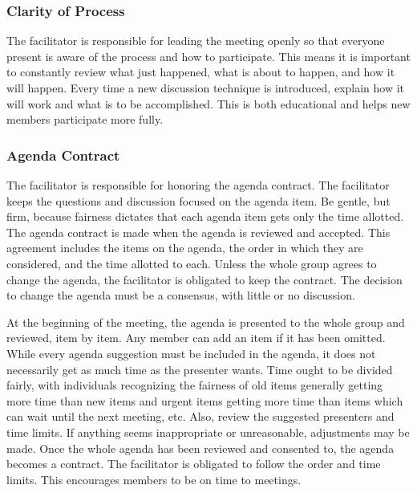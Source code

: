 \subsubsection*{Clarity of Process}

The facilitator is responsible for leading the meeting openly so
that everyone present is aware of the process and how to
participate. This means it is important to constantly review what
just happened, what is about to happen, and how it will
happen. Every time a new discussion technique is introduced,
explain how it will work and what is to be accomplished. This is
both educational and helps new members participate more fully.


\subsubsection*{Agenda Contract}

The facilitator is responsible for honoring the agenda
contract. The facilitator keeps the questions and discussion
focused on the agenda item. Be gentle, but firm, because fairness
dictates that each agenda item gets only the time allotted. The
agenda contract is made when the agenda is reviewed and
accepted. This agreement includes the items on the agenda, the
order in which they are considered, and the time allotted to
each. Unless the whole group agrees to change the agenda, the
facilitator is obligated to keep the contract. The decision to
change the agenda must be a consensus, with little or no discussion.

At the beginning of the meeting, the agenda is presented to the
whole group and reviewed, item by item. Any member can add an item
if it has been omitted. While every agenda suggestion must be
included in the agenda, it does not necessarily get as much time as
the presenter wants. Time ought to be divided fairly, with
individuals recognizing the fairness of old items generally getting
more time than new items and urgent items getting more time than
items which can wait until the next meeting, etc. Also, review the
suggested presenters and time limits. If anything seems
inappropriate or unreasonable, adjustments may be made. Once the
whole agenda has been reviewed and consented to, the agenda becomes
a contract. The facilitator is obligated to follow the order and
time limits. This encourages members to be on time to meetings.



